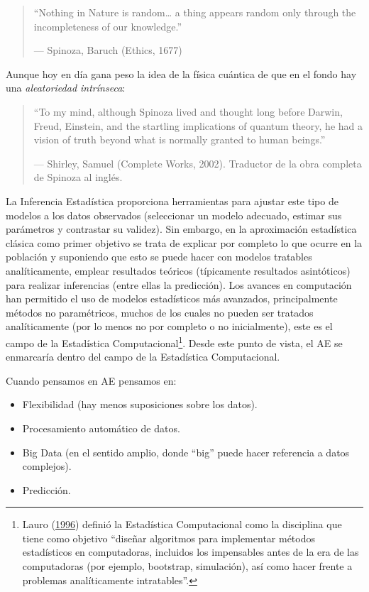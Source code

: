 \documentclass[
]{book}
\theoremstyle{break}
\theoremstyle{nonumberplain}
\begin{document}
\begin{quote}
``Nothing in Nature is random\ldots{} a thing appears random only through the incompleteness of our knowledge.''

--- Spinoza, Baruch (Ethics, 1677)
\end{quote}

Aunque hoy en día gana peso la idea de la física cuántica de que en el fondo hay una \emph{aleatoriedad intrínseca}:

\begin{quote}
``To my mind, although Spinoza lived and thought long before Darwin, Freud, Einstein, and the startling implications of quantum theory, he had a vision of truth beyond what is normally granted to human beings.''

--- Shirley, Samuel (Complete Works, 2002).
Traductor de la obra completa de Spinoza al inglés.
\end{quote}

La Inferencia Estadística proporciona herramientas para ajustar este tipo de modelos a los datos observados (seleccionar un modelo adecuado, estimar sus parámetros y contrastar su validez).
Sin embargo, en la aproximación estadística clásica como primer objetivo se trata de explicar por completo lo que ocurre en la población y suponiendo que esto se puede hacer con modelos tratables analíticamente, emplear resultados teóricos (típicamente resultados asintóticos) para realizar inferencias (entre ellas la predicción).
Los avances en computación han permitido el uso de modelos estadísticos más avanzados, principalmente métodos no paramétricos, muchos de los cuales no pueden ser tratados analíticamente (por lo menos no por completo o no inicialmente), este es el campo de la Estadística Computacional\footnote{Lauro (\protect\hyperlink{ref-lauro1996computational}{1996}) definió la Estadística Computacional como la disciplina que tiene como objetivo ``diseñar algoritmos para implementar métodos estadísticos en computadoras, incluidos los impensables antes de la era de las computadoras (por ejemplo, bootstrap, simulación), así como hacer frente a problemas analíticamente intratables''.}.
Desde este punto de vista, el AE se enmarcaría dentro del campo de la Estadística Computacional.

Cuando pensamos en AE pensamos en:

\begin{itemize}
\item
  Flexibilidad (hay menos suposiciones sobre los datos).
\item
  Procesamiento automático de datos.
\item
  Big Data (en el sentido amplio, donde ``big'' puede hacer referencia a datos complejos).
\item
  Predicción.
\end{itemize}
\end{document}
